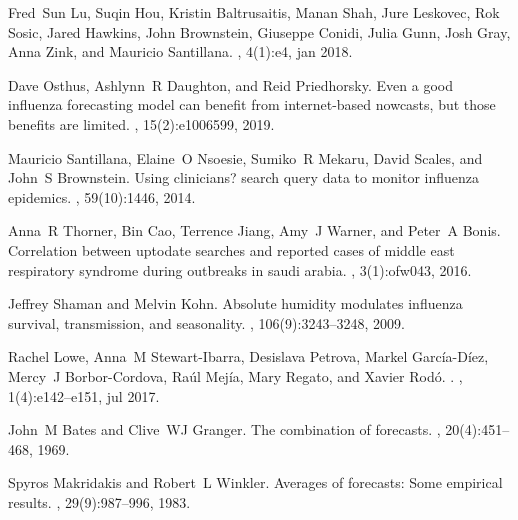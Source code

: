 \documentclass[a4paper]{article}
\begin{document}
\begin{thebibliography}{100}
Fred~Sun Lu, Suqin Hou, Kristin Baltrusaitis, Manan Shah, Jure Leskovec, Rok
  Sosic, Jared Hawkins, John Brownstein, Giuseppe Conidi, Julia Gunn, Josh
  Gray, Anna Zink, and Mauricio Santillana.
, 4(1):e4, jan 2018.

Dave Osthus, Ashlynn~R Daughton, and Reid Priedhorsky.
\newblock Even a good influenza forecasting model can benefit from
  internet-based nowcasts, but those benefits are limited.
, 15(2):e1006599, 2019.

Mauricio Santillana, Elaine~O Nsoesie, Sumiko~R Mekaru, David Scales, and
  John~S Brownstein.
\newblock Using clinicians? search query data to monitor influenza epidemics.
, 59(10):1446, 2014.

Anna~R Thorner, Bin Cao, Terrence Jiang, Amy~J Warner, and Peter~A Bonis.
\newblock Correlation between uptodate searches and reported cases of middle
  east respiratory syndrome during outbreaks in saudi arabia.
, 3(1):ofw043, 2016.

Jeffrey Shaman and Melvin Kohn.
\newblock Absolute humidity modulates influenza survival, transmission, and
  seasonality.
,
  106(9):3243--3248, 2009.

Rachel Lowe, Anna~M Stewart-Ibarra, Desislava Petrova, Markel
  Garc{\'{i}}a-D{\'{i}}ez, Mercy~J Borbor-Cordova, Ra{\'{u}}l Mej{\'{i}}a, Mary
  Regato, and Xavier Rod{\'{o}}.
.
, 1(4):e142--e151, jul 2017.

John~M Bates and Clive~WJ Granger.
\newblock The combination of forecasts.
, 20(4):451--468,
  1969.

Spyros Makridakis and Robert~L Winkler.
\newblock Averages of forecasts: Some empirical results.
, 29(9):987--996, 1983.


\end{thebibliography}
\end{document}
